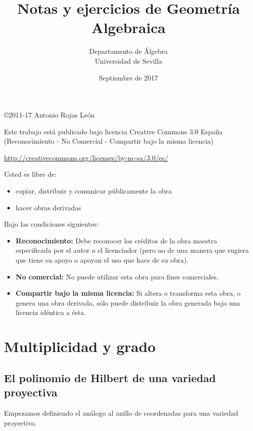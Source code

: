 \documentclass[a4paper,10pt]{book}
\title{Notas y ejercicios de Geometría Algebraica}
\author{Departamento de Álgebra \\ Universidad de Sevilla}
\date{Septiembre de 2017}
\begin{document}
\setcounter{chapter}{5}
\maketitle

\vspace*{\fill}

\copyright{2011-17 Antonio Rojas León}

\bigskip

Este trabajo está publicado bajo licencia Creative Commons 3.0 España (Reconocimiento - No Comercial - Compartir bajo la misma licencia)

\url{http://creativecommons.org/licenses/by-nc-sa/3.0/es/}

\bigskip

Usted es libre de:
\begin{itemize}
 \item copiar, distribuir y comunicar públicamente la obra
\item hacer obras derivadas
\end{itemize}

Bajo las condiciones siguientes:
\begin{itemize}
 \item {\bf Reconocimiento:} Debe reconocer los créditos de la obra maestra especificada por el autor o el licenciador (pero no de una manera que sugiera que tiene su apoyo o apoyan el uso que hace de su obra).
 \item {\bf No comercial:} No puede utilizar esta obra para fines comerciales.
\item {\bf Compartir bajo la misma licencia:} Si altera o transforma esta obra, o genera una obra derivada, sólo puede distribuir la obra generada bajo una licencia idéntica a ésta.
\end{itemize}




\newpage


\chapter{Multiplicidad y grado}

\section[El polinomio de Hilbert]{El polinomio de Hilbert de una variedad proyectiva}

Empezamos definiendo el análogo al anillo de coordenadas para una variedad proyectiva.
\end{document}
